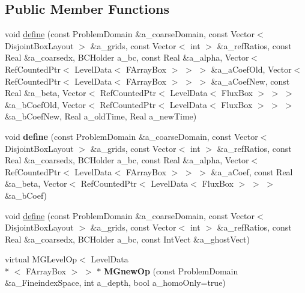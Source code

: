 \subsection*{Public Member Functions}
\begin{DoxyCompactItemize}
\item 
void \hyperlink{class_v_c_a_m_r_poisson_op_time_dep_factory_a155c54da96854d3f3de55b183c27231e}{define} (const Problem\-Domain \&a\-\_\-coarse\-Domain, const Vector$<$ Disjoint\-Box\-Layout $>$ \&a\-\_\-grids, const Vector$<$ int $>$ \&a\-\_\-ref\-Ratios, const Real \&a\-\_\-coarsedx, B\-C\-Holder a\-\_\-bc, const Real \&a\-\_\-alpha, Vector$<$ Ref\-Counted\-Ptr$<$ Level\-Data$<$ F\-Array\-Box $>$ $>$ $>$ \&a\-\_\-a\-Coef\-Old, Vector$<$ Ref\-Counted\-Ptr$<$ Level\-Data$<$ F\-Array\-Box $>$ $>$ $>$ \&a\-\_\-a\-Coef\-New, const Real \&a\-\_\-beta, Vector$<$ Ref\-Counted\-Ptr$<$ Level\-Data$<$ Flux\-Box $>$ $>$ $>$ \&a\-\_\-b\-Coef\-Old, Vector$<$ Ref\-Counted\-Ptr$<$ Level\-Data$<$ Flux\-Box $>$ $>$ $>$ \&a\-\_\-b\-Coef\-New, Real a\-\_\-old\-Time, Real a\-\_\-new\-Time)
\item 
\hypertarget{class_v_c_a_m_r_poisson_op_time_dep_factory_a8ff4f48663dd2a742c3fa10540aa4830}{void {\bfseries define} (const Problem\-Domain \&a\-\_\-coarse\-Domain, const Vector$<$ Disjoint\-Box\-Layout $>$ \&a\-\_\-grids, const Vector$<$ int $>$ \&a\-\_\-ref\-Ratios, const Real \&a\-\_\-coarsedx, B\-C\-Holder a\-\_\-bc, const Real \&a\-\_\-alpha, Vector$<$ Ref\-Counted\-Ptr$<$ Level\-Data$<$ F\-Array\-Box $>$ $>$ $>$ \&a\-\_\-a\-Coef, const Real \&a\-\_\-beta, Vector$<$ Ref\-Counted\-Ptr$<$ Level\-Data$<$ Flux\-Box $>$ $>$ $>$ \&a\-\_\-b\-Coef)}\label{class_v_c_a_m_r_poisson_op_time_dep_factory_a8ff4f48663dd2a742c3fa10540aa4830}

\item 
void \hyperlink{class_v_c_a_m_r_poisson_op_time_dep_factory_ad107c2942cb78a7d2a34f8d3acff5d30}{define} (const Problem\-Domain \&a\-\_\-coarse\-Domain, const Vector$<$ Disjoint\-Box\-Layout $>$ \&a\-\_\-grids, const Vector$<$ int $>$ \&a\-\_\-ref\-Ratios, const Real \&a\-\_\-coarsedx, B\-C\-Holder a\-\_\-bc, const Int\-Vect \&a\-\_\-ghost\-Vect)
\item 
\hypertarget{class_v_c_a_m_r_poisson_op_time_dep_factory_aef3fbbfbaf1502b9c16e2ee390f8f0f0}{virtual M\-G\-Level\-Op$<$ Level\-Data\\*
$<$ F\-Array\-Box $>$ $>$ $\ast$ {\bfseries M\-Gnew\-Op} (const Problem\-Domain \&a\-\_\-\-Fineindex\-Space, int a\-\_\-depth, bool a\-\_\-homo\-Only=true)}\label{class_v_c_a_m_r_poisson_op_time_dep_factory_aef3fbbfbaf1502b9c16e2ee390f8f0f0}


\end{DoxyCompactItemize}
